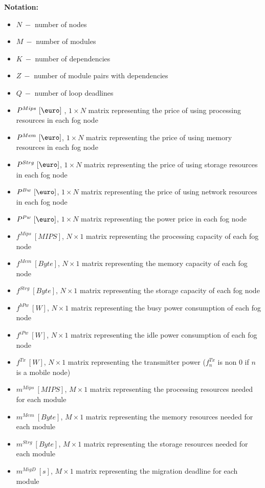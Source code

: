 \documentclass{article}
\begin{document}
\newcommand{\SubItem}[1]{
    {\setlength\itemindent{15pt} \item[-] #1}
}

\noindent\textbf{Notation:}
\begin{itemize}
	\item $N~-$ number of nodes
	\item $M~-$ number of modules
	\item $K~-$ number of dependencies
	\item $Z~-$ number of module pairs with dependencies
	\item $Q~-$ number of loop deadlines\\
	
	\item $P^{Mips}~[\mbox{\euro}]~$, $1\times N$ matrix representing the price of using processing resources in each fog node
	\item $P^{Mem}~[\mbox{\euro}]$, $1\times N$ matrix representing the price of using memory resources in each fog node
	\item $P^{Strg}~[\mbox{\euro}]$, $1\times N$ matrix representing the price of using storage resources in each fog node
	\item $P^{Bw}~[\mbox{\euro}]$, $1\times N$ matrix representing the price of using network resources in each fog node
	\item $P^{Pw}~[\mbox{\euro}]$, $1\times N$ matrix representing the power price in each fog node\\
	
	\item $f^{Mips}~[MIPS]$, $N\times 1$ matrix representing the processing capacity of each fog node
	\item $f^{Mem}~[Byte]$, $N\times 1$ matrix representing the memory capacity of each fog node
	\item $f^{Strg}~[Byte]$, $N\times 1$ matrix representing the storage capacity of each fog node
	\item $f^{bPw}~[W]$, $N\times 1$ matrix representing the busy power consumption of each fog node
	\item $f^{iPw}~[W]$, $N\times 1$ matrix representing the idle power consumption of each fog node
	\item $f^{Tx}~[W]$, $N\times 1$ matrix representing the transmitter power ($f^{Tx}_n$ is non 0 if $n$ is a mobile node)\\
	
	\item $m^{Mips}~[MIPS]$, $M\times 1$ matrix representing the processing resources needed for each module
	\item $m^{Mem}~[Byte]$, $M\times 1$ matrix representing the memory resources needed for each module
	\item $m^{Strg}~[Byte]$, $M\times 1$ matrix representing the storage resources needed for each module
	\item $m^{MigD}~[s]$, $M\times 1$ matrix representing the migration deadline for each module\\
	

\end{itemize}
\end{document}
